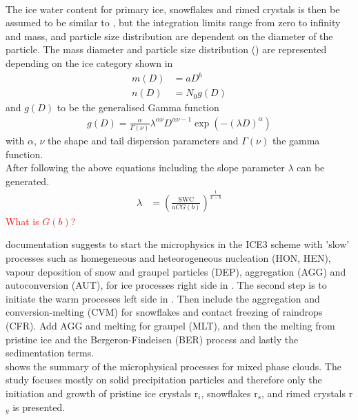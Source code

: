 \\
The ice water content for primary ice, snowflakes and rimed crystals is then be assumed to be similar to , but the integration limits range from zero to infinity and mass, and particle size distribution are dependent on the diameter of the particle. The mass diameter and particle size distribution () are represented depending on the ice category shown in 
\begin{align}
m(D) & = aD^b 	\label{eq:mass_diameter} \\
n(D) & = N_0 g(D)	\label{eq:PSD_MEPS}
\end{align}
and $g(D)$ to be the generalised Gamma function 
\begin{align}
g(D) = \frac{\alpha}{\Gamma(\nu)} \lambda^{\alpha \nu} D^{\alpha \nu -1} \exp\left( -(\lambda D)^\alpha \right)
\end{align}
with $\alpha$, $\nu$ the shape and tail dispersion parameters and $\Gamma(\nu)$ the gamma function. 
\\
After following the above equations including  the slope parameter $\lambda$ can be generated.
\begin{align}
\lambda & = \left( \frac{\text{SWC}}{aCG(b)}\right)^{\frac{1}{x-b}}
\end{align}
\textcolor{red}{What is $G(b)$?}

%

\newline
\cite{meteo_france_meso-nh_2009} documentation suggests to start the microphysics in the ICE3 scheme with 'slow' processes such as homegeneous and heteorogeneous nucleation (HON, HEN), vapour deposition of snow and graupel particles (DEP), aggregation (AGG) and autoconversion (AUT), for ice processes right side in . The second step is to initiate the warm processes left side in . Then include the aggregation and conversion-melting (CVM) for snowflakes and contact freezing of raindrops (CFR). Add AGG and melting for graupel (MLT), and then the melting from pristine ice  and the Bergeron-Findeisen (BER) process and lastly the sedimentation terms.  \\
 shows the summary of the microphysical processes for mixed phase clouds. The study focuses mostly on solid precipitation particles and therefore only the initiation and growth of pristine ice crystals r$_i$, snowflakes r$_s$, and rimed crystals r$_g$ is presented. 
